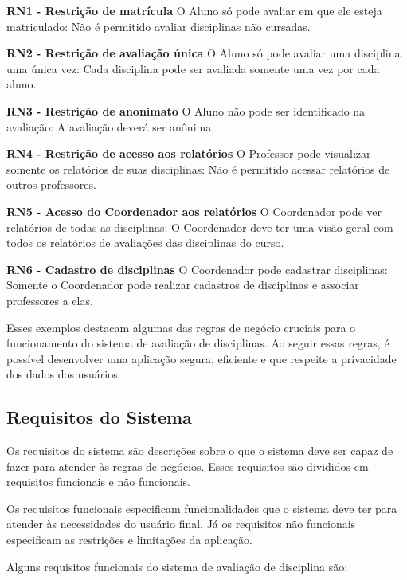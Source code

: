 \begin{alineas}
  \item \textbf{RN1 - Restrição de matrícula} O Aluno só pode avaliar em que ele esteja matriculado: Não é permitido avaliar disciplinas não cursadas.
  \item \textbf{RN2 - Restrição de avaliação única} O Aluno só pode avaliar uma disciplina uma única vez: Cada disciplina pode ser avaliada somente uma vez por cada aluno.
  \item \textbf{RN3 - Restrição de anonimato} O Aluno não pode ser identificado na avaliação: A avaliação deverá ser anônima.
  \item \textbf{RN4 - Restrição de acesso aos relatórios} O Professor pode visualizar somente os relatórios de suas disciplinas: Não é permitido acessar relatórios de outros professores.
  \item \textbf{RN5 - Acesso do Coordenador aos relatórios} O Coordenador pode ver relatórios de todas as disciplinas: O Coordenador deve ter uma visão geral com todos os relatórios de avaliações das disciplinas do curso.
  \item \textbf{RN6 - Cadastro de disciplinas} O Coordenador pode cadastrar disciplinas: Somente o Coordenador pode realizar cadastros de disciplinas e associar professores a elas.
\end{alineas}

Esses exemplos destacam algumas das regras de negócio cruciais para o funcionamento do sistema de avaliação de disciplinas. Ao seguir essas regras, é possível desenvolver uma aplicação segura, eficiente e que respeite a privacidade dos dados dos usuários.

\subsection{Requisitos do Sistema}
Os requisitos do sistema são descrições sobre o que o sistema deve ser capaz de fazer para atender às regras de negócios. Esses requisitos são divididos em requisitos funcionais e não funcionais. 

Os requisitos funcionais especificam funcionalidades que o sistema deve ter para atender às necessidades do usuário final. Já os requisitos não funcionais especificam as restrições e limitações da aplicação.

Alguns requisitos funcionais do sistema de avaliação de disciplina são:

